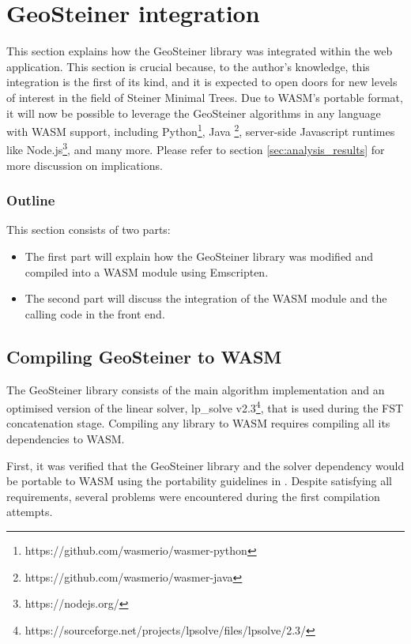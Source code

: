 \documentclass{l4proj}
\begin{document}
\section{GeoSteiner integration}
\label{sec:geosteiner_integration}
This section explains how the GeoSteiner library was integrated within the web application. This section is crucial because, to the author's knowledge, this integration is the first of its kind, and it is expected to open doors for new levels of interest in the field of Steiner Minimal Trees. Due to WASM's portable format, it will now be possible to leverage the GeoSteiner algorithms in any language with WASM support, including Python\footnote{https://github.com/wasmerio/wasmer-python}, Java \footnote{https://github.com/wasmerio/wasmer-java}, server-side Javascript runtimes like Node.js\footnote{https://nodejs.org/}, and many more. Please refer to section \ref{sec:analysis_results} for more discussion on implications.

\subsubsection{Outline}
This section consists of two parts:
\begin{itemize}
    \item The first part will explain how the GeoSteiner library was modified and compiled into a WASM module using Emscripten.
    \item The second part will discuss the integration of the WASM module and the calling code in the front end.
\end{itemize}

\subsection{Compiling GeoSteiner to WASM}

The GeoSteiner library consists of the main algorithm implementation and an optimised version of the linear solver, lp\_solve v2.3\footnote{https://sourceforge.net/projects/lpsolve/files/lpsolve/2.3/}, that is used during the FST concatenation stage.
Compiling any library to WASM requires compiling all its dependencies to WASM.

First, it was verified that the GeoSteiner library and the solver dependency would be portable to WASM using the portability guidelines in \cite{Emscripten_portability}.
Despite satisfying all requirements, several problems were encountered during the first compilation attempts.
\end{document}
